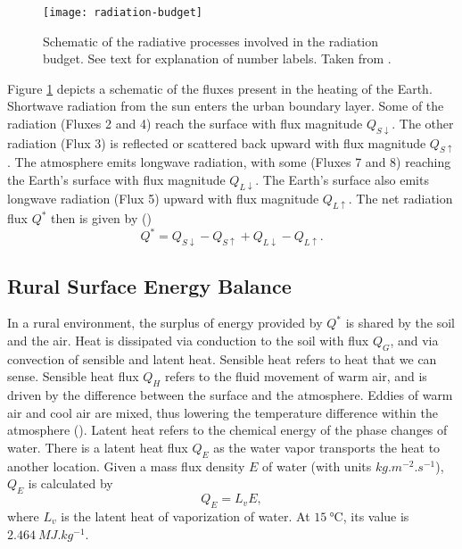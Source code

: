 		\begin{figure}	
			\centering
			\texttt{[image: radiation-budget]}
			\caption{Schematic of the radiative processes involved in the radiation budget. See text for explanation of number labels. Taken from \textcite{Oke1982}.}
			\label{fig:radiation-budget}
		\end{figure}
	
		Figure \ref{fig:radiation-budget} depicts a schematic of the fluxes present in the heating of the Earth.
		Shortwave radiation from the sun enters the urban boundary layer.
		Some of the radiation (Fluxes 2 and 4) reach the surface with flux magnitude $Q_{S\downarrow}$.
		The other radiation (Flux 3) is reflected or scattered back upward with flux magnitude $Q_{S\uparrow}$.
		The atmosphere emits longwave radiation, with some (Fluxes 7 and 8)
		reaching the Earth’s surface with flux magnitude $Q_{L\downarrow}$.
		The Earth’s surface also emits longwave radiation (Flux 5) upward with flux magnitude $Q_{L\uparrow}$.
		The net radiation flux $Q^*$ then is given by (\cite{Wallace2006})
		\begin{equation}
			Q^* = Q_{S\downarrow} - Q_{S\uparrow} + Q_{L\downarrow} - Q_{L\uparrow}.
		\end{equation}

	\subsection{Rural Surface Energy Balance}
			
		In a rural environment, the surplus of energy provided by $Q^*$ is shared by the soil and the air.
		Heat is dissipated via conduction to the soil with flux $Q_G$,
			and via convection of sensible and latent heat.
		Sensible heat refers to heat that we can sense.
		Sensible heat flux $Q_H$ refers to the fluid movement of warm air, and is driven by the difference between the surface and the atmosphere.
		Eddies of warm air and cool air are mixed, thus lowering the temperature difference within the atmosphere (\cite{Oke2017urban}).	
		Latent heat refers to the chemical energy of the phase changes of water. 
		There is a latent heat flux $Q_E$ as the water vapor transports the heat to another location.
		Given a mass flux density $E$ of water (with units $\si{kg.m^{-2}.s^{-1}}$), $Q_E$ is calculated by
		\begin{equation}
			Q_E = L_v E,
		\end{equation}
		where $L_v$ is the latent heat of vaporization of water.
		At $\qty{15}{\unit{\degreeCelsius}}$, its value is $\qty{2.464}{MJ.kg^{-1}}$.
		
